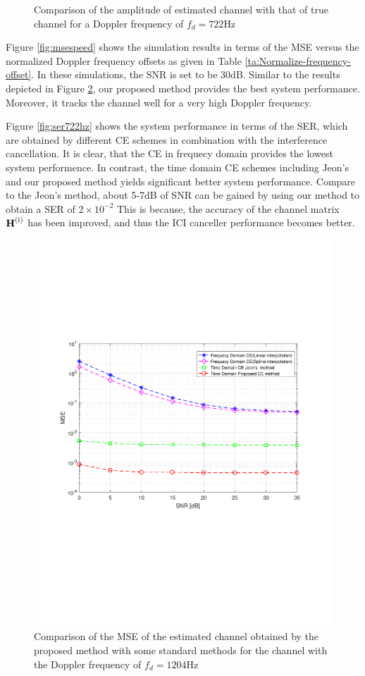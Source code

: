 \documentclass[AMA]{WileyNJD-v1}
\begin{document}
{{{\begin{figure}
	\caption{Comparison of the amplitude of estimated channel with that of true channel for a Doppler frequency of $f_{d}=722$Hz}
	\label{fig:cir722hz}
\end{figure}
%		
Figure \ref{fig:msespeed} shows the simulation results in terms of the MSE versus the normalized Doppler frequency offsets as given in Table \ref{ta:Normalize-frequency-offset}. In these simulations, the SNR is set to be 30dB. Similar to the results depicted in Figure \ref{fig:1204hz}, our proposed method provides the best system performance. Moreover, it tracks the channel well for a very high Doppler frequency.
				
Figure \ref{fig:ser722hz} shows the system performance in terms of the SER, which are obtained by different CE schemes in combination with the interference cancellation. It is clear, that the CE in frequecy domain provides the lowest system performence. In contrast, the time domain CE schemes including Jeon's and our proposed method yields significant better system performance. 
Compare to the Jeon's method, about  5-7dB of SNR can be gained by using our method to obtain a SER of  $2\times 10^{-2}$  This is because, the accuracy of the channel matrix  $\rm{\textbf H^{(i)}}$ has been improved, and thus the ICI canceller performance becomes better. 
%				
\begin{figure}
	\centering
	\includegraphics[width=1.0\linewidth]{figures/mse_1204Hz}
	\caption{Comparison of the MSE of the estimated channel obtained by the proposed	method with some standard methods for the channel with the Doppler frequency of $f_{d}=1204$Hz}
	\label{fig:1204hz}
\end{figure}
				
}}}
\end{document}
